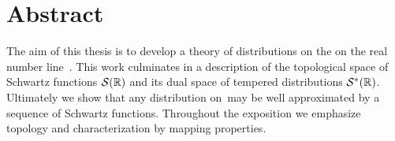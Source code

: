 \chapter*{Abstract}
  The aim of this thesis is to develop a theory of distributions on the on the real number line~\R.
  This work culminates in a description of the topological space of Schwartz functions $\mathcal{S}(\mathbb{R})$ and its dual space of tempered distributions $\mathcal{S}^*(\mathbb{R})$.
  Ultimately we show that any distribution on~\R may be well approximated by a sequence of Schwartz functions.
  Throughout the exposition we emphasize topology and characterization by mapping properties.
